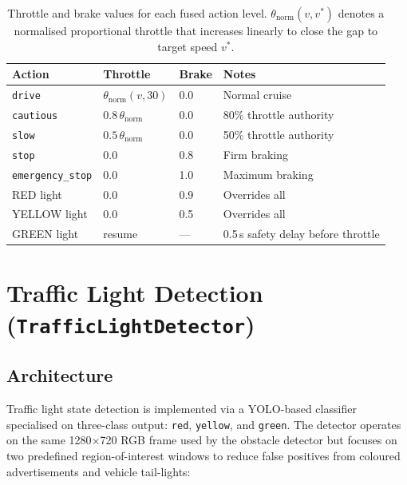 \documentclass[12pt,a4paper]{article}
\begin{document}
\begin{table}[H]
\centering
\caption{Throttle and brake values for each fused action level.
  $\theta_\text{norm}(v,v^*)$ denotes a normalised proportional throttle
  that increases linearly to close the gap to target speed $v^*$.}
\label{tab:throttle_brake}
\begin{tabular}{@{}llll@{}}
\toprule
\textbf{Action} & \textbf{Throttle} & \textbf{Brake} & \textbf{Notes} \\
\midrule
\texttt{drive}          & $\theta_\text{norm}(v,30)$ & 0.0 &
  Normal cruise\\
\texttt{cautious}       & $0.8\,\theta_\text{norm}$ & 0.0 &
  80\% throttle authority\\
\texttt{slow}           & $0.5\,\theta_\text{norm}$ & 0.0 &
  50\% throttle authority\\
\texttt{stop}           & 0.0 & 0.8 &
  Firm braking\\
\texttt{emergency\_stop}& 0.0 & 1.0 &
  Maximum braking\\
\midrule
RED light               & 0.0 & 0.9 & Overrides all \\
YELLOW light            & 0.0 & 0.5 & Overrides all \\
GREEN light             & resume & --- &
  0.5\,s safety delay before throttle\\
\bottomrule
\end{tabular}
\end{table}


\section{Traffic Light Detection (\texttt{TrafficLightDetector})}
\label{sec:traffic_light}

\subsection{Architecture}
\label{subsec:tl_arch}

Traffic light state detection is implemented via a YOLO-based classifier
specialised on three-class output: \texttt{red}, \texttt{yellow}, and
\texttt{green}.  The detector operates on the same 1280$\times$720 RGB frame
used by the obstacle detector but focuses on two predefined region-of-interest
windows to reduce false positives from coloured advertisements and vehicle
tail-lights:
\end{document}
